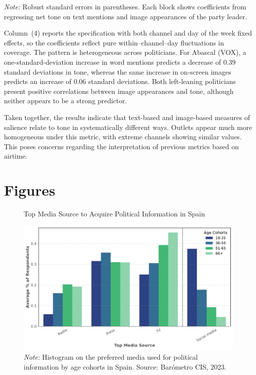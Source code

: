 \documentclass[12pt]{article}
\begin{document}
\begin{table}[htbp!]
	\vspace{0.5em}
	\begin{flushleft}
		\small \textit{Note:} Robust standard errors in parentheses.
		Each block shows coefficients from regressing net tone on text mentions and image appearances of the party leader.
	\end{flushleft}
\end{table}



Column~(4) reports the specification with both channel and day of the week fixed effects, so the coefficients reflect pure within–channel–day fluctuations in coverage. The pattern is heterogeneous across politicians. For Abascal (VOX), a one-standard-deviation increase in word mentions predicts a decrease of $0.39$ standard deviations in tone, whereas the same increase in on-screen images predicts an increase of $0.06$ standard deviations. Both left-leaning politicians present positive correlations between image appearances and tone, although neither appears to be a strong predictor.

Taken together, the results indicate that text-based and image-based measures of salience relate to tone in systematically different ways. Outlets appear much more homogeneous under this metric, with extreme channels showing similar values. This poses concerns regarding the interpretation of previous metrics based on airtime.






\section{Figures}
	
	
	
	\begin{figure}[!htbp]
		\centering
		\caption{Top Media Source to Acquire Political Information in Spain}
		\includegraphics[width=130mm]{figures/age_cohorts}
		\caption*{\small \textit{Note:} Histogram on the preferred media used for political information by age cohorts in Spain.  
			Source: Barómetro CIS, 2023. }
		\label{fig:motivation}
	\end{figure}
	
\end{document}
